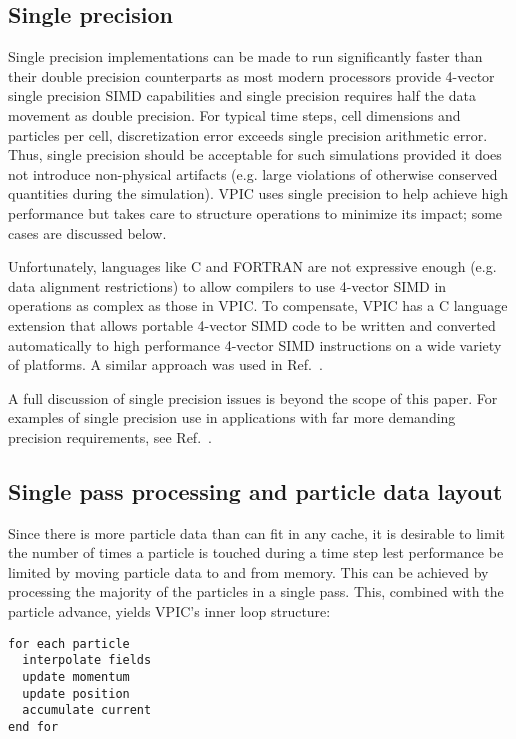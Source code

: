\documentclass[letter,10pt]{article}
\begin{document}
\subsection{Single precision}

Single precision implementations can be made to run significantly
faster than their double precision counterparts as most modern
processors provide 4-vector single precision SIMD capabilities and
single precision requires half the data movement as double precision.
For typical time steps, cell dimensions and particles per cell,
discretization error exceeds single precision arithmetic error.  Thus,
single precision should be acceptable for such simulations provided it
does not introduce non-physical artifacts (e.g. large violations of
otherwise conserved quantities during the simulation).  VPIC uses
single precision to help achieve high performance but takes care to
structure operations to minimize its impact; some cases are discussed
below.

Unfortunately, languages like C and FORTRAN are not expressive enough
(e.g. data alignment restrictions) to allow compilers to use 4-vector
SIMD in operations as complex as those in VPIC.  To compensate, VPIC
has a C language extension that allows portable 4-vector SIMD code to
be written and converted automatically to high performance 4-vector
SIMD instructions on a wide variety of platforms.  A similar approach
was used in Ref.~\cite{Bowers_et_al_2006}.

A full discussion of single precision issues is beyond the scope of
this paper.  For examples of single precision use in applications with
far more demanding precision requirements, see
Ref.~\cite{Bowers_et_al_2006,Lippert_et_al_2007}.

\subsection{Single pass processing and particle data layout}

Since there is more particle data than can fit in any cache, it is
desirable to limit the number of times a particle is touched during a
time step lest performance be limited by moving particle data to and
from memory.  This can be achieved by processing the majority of the
particles in a single pass.  This, combined with the particle advance,
yields VPIC's inner loop structure:
\begin{verbatim}
for each particle
  interpolate fields
  update momentum
  update position
  accumulate current
end for
\end{verbatim}
\end{document}
